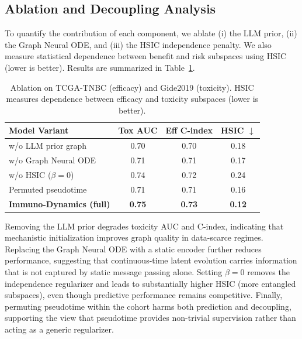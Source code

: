 \documentclass{article}
\begin{document}
\subsection{Ablation and Decoupling Analysis}

To quantify the contribution of each component, we ablate (i) the LLM prior, (ii) the Graph Neural ODE, and (iii) the HSIC independence penalty.
We also measure statistical dependence between benefit and risk subspaces using HSIC (lower is better).
Results are summarized in Table~\ref{tab:ablation}.

\begin{table}[t]
\small
\centering
\setlength{\tabcolsep}{3pt}
\caption{Ablation on TCGA-TNBC (efficacy) and Gide2019 (toxicity). HSIC measures dependence between efficacy and toxicity subspaces (lower is better).}
\label{tab:ablation}
\begin{tabularx}{\linewidth}{X c c c}
\toprule
\textbf{Model Variant} & \textbf{Tox AUC} & \textbf{Eff C-index} & \textbf{HSIC} $\downarrow$ \\
\midrule
w/o LLM prior graph    & 0.70 & 0.70 & 0.18 \\
w/o Graph Neural ODE   & 0.71 & 0.71 & 0.17 \\
w/o HSIC ($\beta{=}0$) & 0.74 & 0.72 & 0.24 \\
Permuted pseudotime    & 0.71 & 0.71 & 0.16 \\
\midrule
\textbf{Immuno-Dynamics (full)} & \textbf{0.75} & \textbf{0.73} & \textbf{0.12} \\
\bottomrule
\end{tabularx}
\end{table}


Removing the LLM prior degrades toxicity AUC and C-index, indicating that mechanistic initialization improves graph quality in data-scarce regimes.
Replacing the Graph Neural ODE with a static encoder further reduces performance, suggesting that continuous-time latent evolution carries information that is not captured by static message passing alone.
Setting $\beta{=}0$ removes the independence regularizer and leads to substantially higher HSIC (more entangled subspaces), even though predictive performance remains competitive.
Finally, permuting pseudotime within the cohort harms both prediction and decoupling, supporting the view that pseudotime provides non-trivial supervision rather than acting as a generic regularizer.
\end{document}
